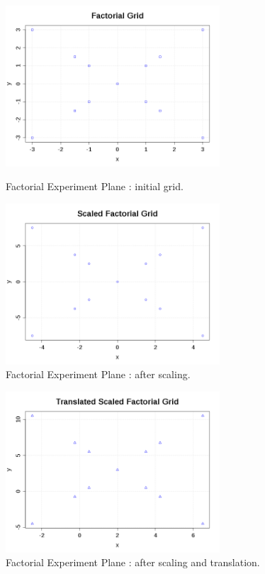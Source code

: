 \begin{figure}[H]
  \begin{minipage}{10cm}
    \begin{center}
      \includegraphics[width=8cm]{FactorialGrid.png}
      \caption{Factorial Experiment Plane : initial grid.}
      \label{FactorialGrid}
    \end{center}
  \end{minipage}
  \hfill
  \begin{minipage}{10cm}
    \begin{center}
      \includegraphics[width=8cm]{ScaledFactorialGrid.png}
      \caption{Factorial Experiment Plane : after scaling.}
      \label{ScaledFactorialGrid}
    \end{center}
  \end{minipage}
\end{figure}




\begin{figure}[H]
  \begin{center}
    \includegraphics[width=8cm]{TranslatedScaledFactorialGrid.png}
  \end{center}
  \caption{Factorial Experiment Plane : after scaling and translation.}
  \label{TranslatedScaledFactorialGrid}
\end{figure}





